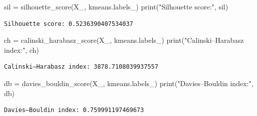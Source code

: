 \documentclass[
  letterpaper,
  DIV=11,
  numbers=noendperiod]{scrreprt}
\newenvironment{Shaded}{\begin{snugshade}}{\end{snugshade}}
\newcommand{\BuiltInTok}[1]{\textcolor[rgb]{0.00,0.23,0.31}{#1}}
\newcommand{\NormalTok}[1]{\textcolor[rgb]{0.00,0.23,0.31}{#1}}
\newcommand{\OperatorTok}[1]{\textcolor[rgb]{0.37,0.37,0.37}{#1}}
\newcommand{\StringTok}[1]{\textcolor[rgb]{0.13,0.47,0.30}{#1}}
\begin{document}
\begin{Shaded}
\begin{Highlighting}[]
\NormalTok{sil }\OperatorTok{=}\NormalTok{ silhouette\_score(X\_, kmeans.labels\_)}
\BuiltInTok{print}\NormalTok{(}\StringTok{"Silhouette score:"}\NormalTok{, sil)}
\end{Highlighting}
\end{Shaded}

\begin{verbatim}
Silhouette score: 0.5236390407534037
\end{verbatim}

\begin{Shaded}
\begin{Highlighting}[]
\NormalTok{ch }\OperatorTok{=}\NormalTok{ calinski\_harabasz\_score(X\_, kmeans.labels\_)}
\BuiltInTok{print}\NormalTok{(}\StringTok{"Calinski–Harabasz index:"}\NormalTok{, ch)}
\end{Highlighting}
\end{Shaded}

\begin{verbatim}
Calinski–Harabasz index: 3878.7108039937557
\end{verbatim}

\begin{Shaded}
\begin{Highlighting}[]
\NormalTok{db }\OperatorTok{=}\NormalTok{ davies\_bouldin\_score(X\_, kmeans.labels\_)}
\BuiltInTok{print}\NormalTok{(}\StringTok{"Davies–Bouldin index:"}\NormalTok{, db)}
\end{Highlighting}
\end{Shaded}

\begin{verbatim}
Davies–Bouldin index: 0.759991197469673
\end{verbatim}
\end{document}
